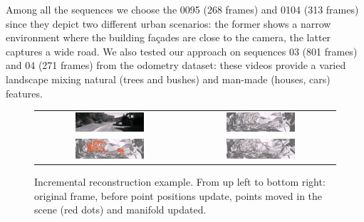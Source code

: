 Among all the sequences we choose the 0095 (268 frames) and 0104 (313 frames) since they depict two different urban scenarios: the former shows a narrow environment where the building fa\c{c}ades are close to the camera, the latter captures a wide road.
We also tested our approach on sequences 03 (801 frames) and 04 (271 frames) from the odometry dataset: these videos provide a varied landscape mixing natural (trees and bushes) and man-made (houses, cars) features.


\begin{figure}[t]
\centering
\begin{tabular}{cc}
\includegraphics[width = 0.48\textwidth]{./img//ExRec_cropped}&
\includegraphics[width = 0.48\textwidth]{./img//ExRec01_cropped}\\
\includegraphics[width = 0.48\textwidth]{./img//ExRec02_cropped}&
\includegraphics[width = 0.48\textwidth]{./img//ExRec05}\\
\end{tabular}
\caption{Incremental reconstruction example. From up left to bottom right: original frame, before point positions update, points moved in the scene (red dots) and  manifold updated.}
\label{fig:exampleFr}
\end{figure}


